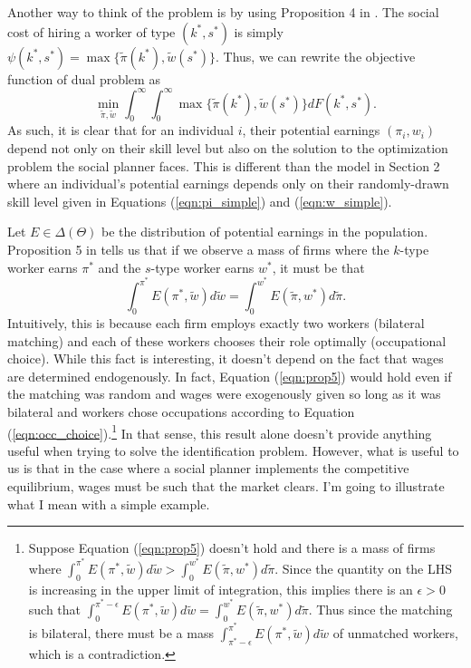 \documentclass[12 pt]{article}
\begin{document}
Another way to think of the problem is by using Proposition 4 in \citet{mak2025occupational}. The social cost of hiring a worker of type $(k^*,s^*)$ is simply $\psi(k^*,s^*) = \max\{\tilde{\pi}(k^*),\tilde{w}(s^*)\}$. Thus, we can rewrite the objective function of dual problem as
\begin{equation*}
	\min_{\tilde{\pi},\tilde{w}} \int_0^\infty \int_0^\infty \max\{\tilde{\pi}(k^*),\tilde{w}(s^*)\} dF(k^*,s^*).
\end{equation*}
As such, it is clear that for an individual $i$, their potential earnings $(\pi_i,w_i)$ depend not only on their skill level but also on the solution to the optimization problem the social planner faces. This is different than the model in Section 2 where an individual's potential earnings depends only on their randomly-drawn skill level given in Equations (\ref{eqn:pi_simple}) and (\ref{eqn:w_simple}).

Let $E \in \Delta(\Theta)$ be the distribution of potential earnings in the population. Proposition 5 in \citet{mak2025occupational} tells us that if we observe a mass of firms where the $k$-type worker earns $\pi^*$ and the $s$-type worker earns $w^*$, it must be that
\begin{equation}
	\int_0^{\pi^*} E(\pi^*,\tilde{w}) d\tilde{w} = \int_0^{w^*} E(\tilde{\pi},w^*) d \tilde{\pi}.
	\label{eqn:prop5}
\end{equation}
Intuitively, this is because each firm employs exactly two workers (bilateral matching) and each of these workers chooses their role optimally (occupational choice). While this fact is interesting, it doesn't depend on the fact that wages are determined endogenously. In fact, Equation (\ref{eqn:prop5}) would hold even if the matching was random and wages were exogenously given so long as it was bilateral and workers chose occupations according to Equation (\ref{eqn:occ_choice}).\footnote{Suppose Equation (\ref{eqn:prop5}) doesn't hold and there is a mass of firms where $\int_0^{\pi^*} E(\pi^*,\tilde{w}) d\tilde{w} > \int_0^{w^*} E(\tilde{\pi},w^*) d \tilde{\pi}$. Since the quantity on the LHS is increasing in the upper limit of integration, this implies there is an $\epsilon > 0$ such that $\int_0^{\pi^*-\epsilon} E(\pi^*,\tilde{w}) d\tilde{w} = \int_0^{w^*} E(\tilde{\pi},w^*) d \tilde{\pi}$. Thus since the matching is bilateral, there must be a mass $\int_{\pi^*-\epsilon}^{\pi^*} E(\pi^*,\tilde{w}) d\tilde{w}$ of unmatched workers, which is a contradiction. } In that sense, this result alone doesn't provide anything useful when trying to solve the identification problem. However, what is useful to us is that in the case where a social planner implements the competitive equilibrium, wages must be such that the market clears. I'm going to illustrate what I mean with a simple example.
\end{document}
